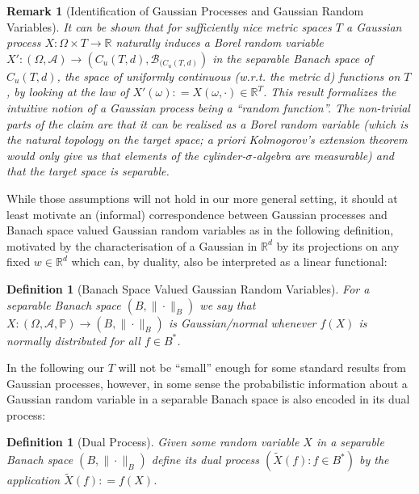 \documentclass[11pt,reqno]{amsart}
\numberwithin{equation}{section}
\newtheorem{defi}[thm]{Definition}
\newtheorem{rem}[thm]{Remark}
\newcommand{\deq}{\mathrel{\mathop:}=}
\begin{document}

\begin{rem}[Identification of Gaussian Processes and Gaussian Random Variables]\label{rem:GPandGrvs}
	It can be shown that for sufficiently nice metric spaces $T$ a Gaussian process $X:\Omega\times T\rightarrow\mathbb R$ naturally induces a Borel random variable $X':(\Omega,\mathcal A)\rightarrow (C_u(T,d),\mathcal B_{(C_u(T,d)})$ in the separable Banach space of $C_u(T,d)$, the space of uniformly continuous (w.r.t. the metric $d$) functions on $T$, by looking at the law of $X'(\omega)\deq X(\omega,\cdot)\in\mathbb R^T$.
	This result formalizes the intuitive notion of a Gaussian process being a ``random function''. The non-trivial parts of the claim are that it can be realised as a \emph{Borel} random variable (which is the natural topology on the target space; a priori Kolmogorov's extension theorem would only give us that elements of the cylinder-$\sigma$-algebra are measurable) and that the target space is \emph{separable}.
\end{rem}

While those assumptions will not hold in our more general setting, it should at least motivate an (informal) correspondence between Gaussian processes and Banach space valued Gaussian random variables as in the following definition, motivated by the characterisation of a Gaussian in $\mathbb R^d$ by its projections on any fixed $w\in\mathbb R^d$ which can, by duality, also be interpreted as a linear functional:

\begin{defi}[Banach Space Valued Gaussian Random Variables]
	For a separable Banach space $(B,\|\cdot\|_B)$ we say that $X:(\Omega,\mathcal A,\mathbb P)\rightarrow(B,\|\cdot\|_B)$ is Gaussian/normal whenever $f(X)$ is normally distributed for all $f\in B^*$.
\end{defi}

In the following our $T$ will not be ``small'' enough for some standard results from Gaussian processes, however, in some sense the probabilistic information about a Gaussian random variable in a separable Banach space is also encoded in its dual process:

\begin{defi}[Dual Process]
	Given some random variable $X$ in a separable Banach space $(B,\|\cdot\|_B)$ define its dual process $(\tilde X(f): f\in B^*)$ by the application $\tilde X(f)\deq f(X)$.
\end{defi}
\end{document}
